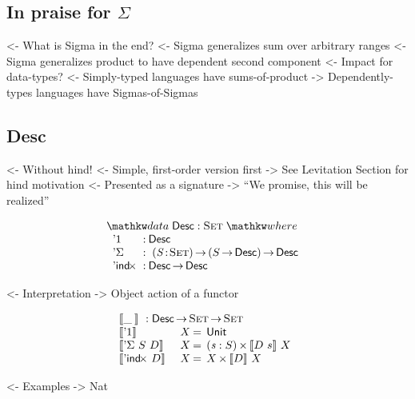 \documentclass[preprint, authoryear, onecolumn]{sigplanconf}
\newenvironment{structure}{\footnotesize\verbatim}{\endverbatim}
\begin{document}
\subsection{In praise for $\Sigma$}

\begin{structure}
<- What is Sigma in the end?
    <- Sigma generalizes sum over arbitrary ranges
    <- Sigma generalizes product to have dependent second component
<- Impact for data-types?
    <- Simply-typed languages have sums-of-product
    -> Dependently-types languages have Sigmas-of-Sigmas
\end{structure}

\subsection{Desc}

\begin{structure}
<- Without hind!
    <- Simple, first-order version first
    -> See Levitation Section for hind motivation
<- Presented as a signature
    -> ``We promise, this will be realized''
\end{structure}

\[
\stk{
\data \Desc : \Set \where \\
\;\;\begin{array}{@{}l@{\::\:}l@{\quad}l}
    \DUnit          & \Desc \\
    \DSigma         & \PI{\V{S}}{\Set} \PIS{S \To \Desc} \Desc \\
    \DIndx          & \Desc \To \Desc
\end{array}
}
\]

\begin{structure}
<- Interpretation
    -> Object action of a functor
\end{structure}


\[\stk{
\descop{\_\:}{} : \Desc \To \Set \To \Set \\
\begin{array}{@{}ll@{\:=\:\:}ll}
\descop{\DUnit}{& X}        &  \Unit                                       \\
\descop{\DSigma{S}{D}}{& X} &  \SIGMAS{\V{s} : S}{\descop{D~s}{X}}         \\
\descop{\DIndx{D}}{& X}     &  \TIMES{X}{\descop{D}{X}}
\end{array}
}\]

\begin{structure}
<- Examples
    -> Nat
\end{structure}
\end{document}
